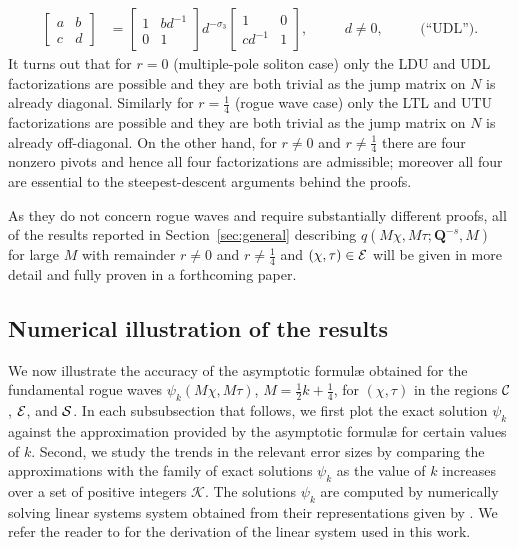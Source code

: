 \begin{equation}
\begin{alignedat}{3}
\begin{bmatrix} a&b\\c&d\end{bmatrix}&=\begin{bmatrix}1 & bd^{-1}\\0 & 1\end{bmatrix}d^{-\sigma_3}
\begin{bmatrix}1 & 0\\cd^{-1}&1\end{bmatrix},&&\quad d\neq 0,&&\quad\text{(``UDL'')}.
\end{alignedat}
\end{equation}
It turns out that for $r=0$ (multiple-pole soliton case) only the LDU and UDL factorizations are possible and they are both trivial as the jump matrix on $N$ is already diagonal.  Similarly for $r=\tfrac{1}{4}$ (rogue wave case) only the LTL and UTU factorizations are possible and they are both trivial as the jump matrix on $N$ is already off-diagonal.  On the other hand, for $r\neq 0$ and $r\neq \tfrac{1}{4}$ there are four nonzero pivots and hence all four factorizations are admissible; moreover all four are essential to the steepest-descent arguments behind the proofs.

As they do not concern rogue waves and require substantially different proofs, all of the results reported in Section~\ref{sec:general} describing $q(M\chi,M\tau;\mathbf{Q}^{-s},M)$ for large $M$ with remainder $r\neq 0$ and $r\neq \tfrac{1}{4}$ and $(\chi,\tau)\in\mathcal{E}$ will be given in more detail and fully proven in a forthcoming paper.


\subsection{Numerical illustration of the results}
%

We now illustrate the accuracy of the asymptotic formul\ae{} obtained for the fundamental rogue waves $\psi_k(M \chi, M \tau)$, $M=\tfrac{1}{2}k+\tfrac{1}{4}$, for $(\chi,\tau)$ in the regions $\mathcal{C}$, $\mathcal{E}$, and $\mathcal{S}$. %
In each subsubsection that follows, we first plot the exact solution $\psi_k$ against the approximation provided by the asymptotic formul\ae{} for certain values of $k$. Second, we study the trends in the relevant error sizes by comparing the approximations with the family of exact solutions $\psi_k$ as the value of $k$ increases over a set of positive integers $\mathcal{K}$.
The solutions $\psi_{k}$ are computed by numerically solving linear systems system obtained from their representations given by . We refer the reader to \cite[Section 3.5]{BilmanM19} for the derivation of the linear system used in this work. 


